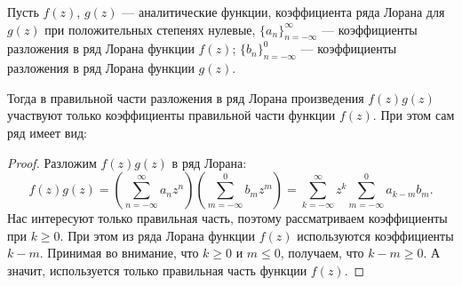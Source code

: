\documentclass[../paper.tex]{subfiles}
\begin{document}
\begin{Lem}
\label{product-series}
Пусть $f(z)$, $g(z)$ --- аналитические функции,
коэффициента ряда Лорана для $g(z)$ при положительных степенях нулевые,
$\{a_n\}_{n=-\infty}^\infty$ --- коэффициенты разложения в ряд Лорана функции $f(z)$;
$\{b_n\}_{n=-\infty}^{0}$ --- коэффициенты разложения в ряд Лорана функции $g(z)$.

Тогда в правильной части разложения в ряд Лорана произведения $f(z)g(z)$ участвуют только коэффициенты правильной части функции $f(z)$.
При этом сам ряд имеет вид:

\end{Lem}
\begin{proof}
Разложим $f(z)g(z)$ в ряд Лорана:
\[
	f(z)g(z)
	= \left(\sum_{n=-\infty}^{\infty} a_n z^n\right)
		\left(\sum_{m=-\infty}^{0} b_m z^m\right)
	= \sum_{k=-\infty}^{\infty} z^k \sum_{m=-\infty}^{0} a_{k-m} b_m
.\]
Нас интересуют только правильная часть, поэтому рассматриваем коэффициенты при $k \geqslant 0$.
При этом из ряда Лорана функции $f(z)$ используются коэффициенты $k-m$.
Принимая во внимание, что $k \geqslant 0$ и $m \leqslant 0$, получаем, что $k - m \geqslant 0$.
А значит, используется только правильная часть функции $f(z)$.
\end{proof}
\end{document}
